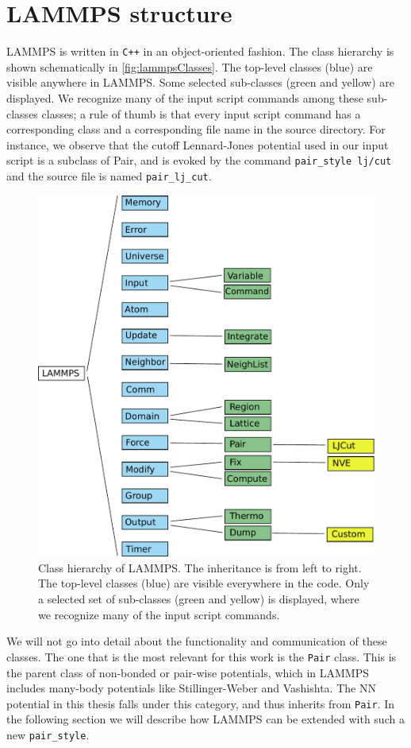 \documentclass[twoside,english]{uiofysmaster}
\begin{document}
\section{LAMMPS structure}
LAMMPS is written in \texttt{C++} in an object-oriented
fashion. The class hierarchy is shown schematically
in \autoref{fig:lammpsClasses}. 
The top-level classes (blue)
are visible anywhere in LAMMPS.
Some selected sub-classes (green and yellow) are displayed. We recognize many 
of the input script commands among these sub-classes
classes; a rule of thumb is that every input script
command has a corresponding class and a
corresponding file name in the source directory. 
For instance, we observe that the cutoff Lennard-Jones potential
used in our input script is a subclass of Pair,
and is evoked by the command
\texttt{pair\_style lj/cut} and the source file is named
\texttt{pair\_lj\_cut}. 
\begin{figure}
\begin{center}
 \includegraphics[width = 0.8\linewidth]{Figures/Implementation/lammpsClasses.pdf}
  \caption{Class hierarchy of LAMMPS. The inheritance is from left to right. 
	   The top-level classes (blue) are visible everywhere in the code. Only a selected set 
	   of sub-classes (green and yellow) is displayed, where we recognize many of the input script
	   commands.}
  \label{fig:lammpsClasses}
  \end{center}
\end{figure}

We will not go into detail about the functionality
and communication of these classes. The one
that is the most relevant for this work is the \texttt{Pair} class. 
This is the parent class of non-bonded or pair-wise potentials, which
in LAMMPS includes many-body potentials like Stillinger-Weber and 
Vashishta. The NN potential in this thesis falls 
under this category, and thus inherits from \texttt{Pair}. 
In the following section we will describe how 
LAMMPS can be extended with such a new \texttt{pair\_style}.
\end{document}
